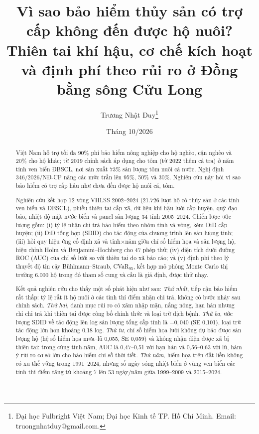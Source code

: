 \documentclass[12pt,a4paper]{article}
\title{\textbf{Vì sao bảo hiểm thủy sản có trợ cấp không đến được hộ nuôi? Thiên tai khí hậu, cơ chế kích hoạt và định phí theo rủi ro ở Đồng bằng sông Cửu Long}}
\author{Trương Nhật Duy\thanks{Đại học Fulbright Việt Nam; Đại học Kinh tế TP. Hồ Chí Minh. Email: truongnhatduy@gmail.com.}}
\date{Tháng 10/2026}
\begin{document}
\maketitle

\begin{abstract}
\noindent Việt Nam hỗ trợ tối đa 90\% phí bảo hiểm nông nghiệp cho hộ nghèo, cận nghèo và 20\% cho hộ khác; từ 2019 chính sách áp dụng cho tôm (từ 2022 thêm cá tra) ở năm tỉnh ven biển ĐBSCL, nơi sản xuất 73\% sản lượng tôm nuôi cả nước. Nghị định 346/2026/NĐ-CP nâng các mức trần lên 95\%, 50\% và 30\%. Nghiên cứu này hỏi vì sao bảo hiểm có trợ cấp hầu như chưa đến được hộ nuôi cá, tôm.

\noindent Nghiên cứu kết hợp 12 vòng VHLSS 2002--2024 (21.726 lượt hộ có thủy sản ở các tỉnh ven biển và ĐBSCL), phiếu thiên tai cấp xã, dữ liệu khí hậu lưới cấp huyện, quỹ đạo bão, nhiệt độ mặt nước biển và panel sản lượng 34 tỉnh 2005--2024. Chiến lược ước lượng gồm: (i) tỷ lệ nhận chi trả bảo hiểm theo nhóm tỉnh và vòng, kèm DiD cấp huyện; (ii) DiD tổng hợp (SDID) cho tác động của chương trình lên sản lượng tỉnh; (iii) hồi quy hiệu ứng cố định xã và tỉnh$\times$năm giữa chỉ số hiểm họa và sản lượng hộ, hiệu chỉnh Holm và Benjamini--Hochberg cho 47 phép thử; (iv) diện tích dưới đường ROC (AUC) của chỉ số lưới so với thiên tai do xã báo cáo; và (v) định phí theo lý thuyết độ tin cậy Bühlmann--Straub, CVaR$_{95}$, kết hợp mô phỏng Monte Carlo thị trường 6.000 hộ trong đó tham số cung và cầu là giả định, được thử nhạy.

\noindent Kết quả nghiên cứu cho thấy một số phát hiện như sau: \textit{Thứ nhất}, tiếp cận bảo hiểm rất thấp: tỷ lệ rất ít hộ nuôi ở các tỉnh thí điểm nhận chi trả, không có bước nhảy sau chính sách. \textit{Thứ hai}, danh mục rủi ro có xâm nhập mặn, nắng nóng, hạn hán nhưng chỉ chi trả khi thiên tai được công bố chính thức và loại trừ dịch bệnh. \textit{Thứ ba}, ước lượng SDID về tác động lên log sản lượng tổng cấp tỉnh là $-0{,}040$ (SE 0,101), loại trừ tác động lớn hơn khoảng 0,18 log. \textit{Thứ tư}, chỉ số hiểm họa lưới không dự báo được sản lượng hộ (hệ số hiểm họa mưa--lũ 0,055, SE 0,059) và không nhận diện được xã bị thiên tai: trong cùng tỉnh-năm, AUC là 0,47--0,51 với hạn hán và 0,56--0,63 với lũ, hàm ý rủi ro cơ sở lớn cho bảo hiểm chỉ số thời tiết. \textit{Thứ năm}, hiểm họa trên đất liền không có xu thế vững trong 1991--2024, nhưng số ngày sóng nhiệt biển ở vùng ven biển các tỉnh thí điểm tăng từ khoảng 7 lên 53 ngày/năm giữa 1999--2009 và 2015--2024.


\end{abstract}
\end{document}
